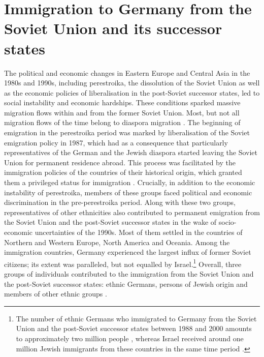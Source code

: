 \section{Immigration to Germany from the Soviet Union and its successor states}
The political and economic changes in Eastern Europe and Central Asia in the 1980s and 1990s, including perestroika, the dissolution of the Soviet Union as well as the economic policies of liberalisation in the post-Soviet successor states, led to social instability and economic hardships. These conditions sparked massive migration flows within and from the former Soviet Union. Most, but not all migration flows of the time belong to diaspora migration \citep{heleniak03}. The beginning of emigration in the perestroika period was marked by liberalisation of the Soviet emigration policy in 1987, which had as a consequence that particularly representatives of the German and the Jewish diaspora started leaving the Soviet Union for permanent residence abroad. This process was facilitated by the immigration policies of the countries of their historical origin, which granted them a privileged status for immigration \citep[cf.][]{deTinguy}. Crucially, in addition to the economic instability of perestroika, members of these groups faced political and economic discrimination in the pre-perestroika period. Along with these two groups, representatives of other ethnicities also contributed to permanent emigration from the Soviet Union and the post-Soviet successor states in the wake of socio-economic uncertainties of the 1990s. Most of them settled in the countries of Northern and Western Europe, North America and Oceania. Among the immigration countries, Germany experienced the largest influx of former Soviet citizens; its extent was paralleled, but not equalled by Israel.\footnote{The number of ethnic Germans who immigrated to Germany from the Soviet Union and the post-Soviet successor states between 1988 and 2000 amounts to approximately two million people \citep{lederer97}, whereas Israel received around one million Jewish immigrants from these countries in the same time period \citep{tolts}.} Overall, three groups of individuals contributed to the immigration from the Soviet Union and the post-Soviet successor states: ethnic Germans, persons of Jewish origin and members of other ethnic groups \citep[cf.][]{brehmer07}.

